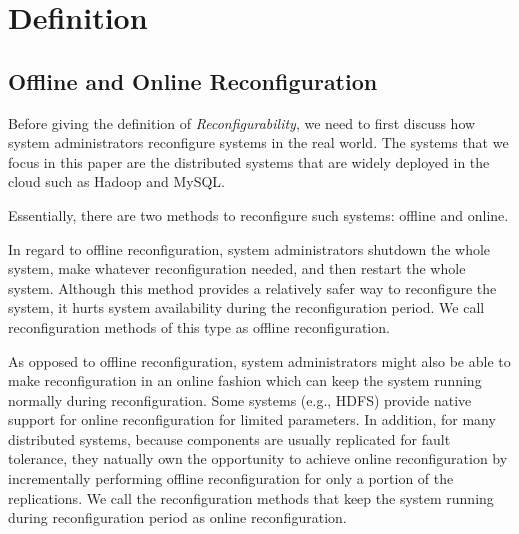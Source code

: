 \section{Definition}






\subsection{Offline and Online Reconfiguration}
Before giving the definition of \textit{Reconfigurability}, we need to first discuss how system administrators reconfigure systems in the real world. The systems that we focus in this paper are the distributed systems that are widely deployed in the cloud such as Hadoop and MySQL.

Essentially, there are two methods to reconfigure such systems: offline and online.

In regard to offline reconfiguration, system administrators shutdown the whole system, make whatever reconfiguration needed, and then restart the whole system. Although this method provides a relatively safer way to reconfigure the system, it hurts system availability during the reconfiguration period. We call reconfiguration methods of this type as offline reconfiguration.  

As opposed to offline reconfiguration, system administrators might also be able to make reconfiguration in an online fashion which can keep the system running normally during reconfiguration. Some systems (e.g., HDFS) provide native support for online reconfiguration for limited parameters. In addition, for many distributed systems, because components are usually replicated for fault tolerance, they natually own the opportunity to achieve online reconfiguration by incrementally performing offline reconfiguration for only a portion of the replications.
We call the reconfiguration methods that keep the system running during reconfiguration period as online reconfiguration. 

